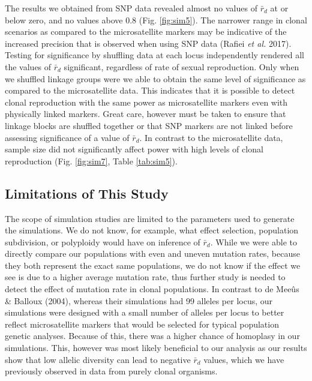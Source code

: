 \documentclass[]{article}
\theoremstyle{definition}
\theoremstyle{definition}
\theoremstyle{definition}
\theoremstyle{remark}
\begin{document}
The results we obtained from SNP data revealed almost no values of
\(\bar{r}_d\) at or below zero, and no values above 0.8 (Fig.
\ref{fig:sim5}). The narrower range in clonal scenarios as compared to
the microsatellite markers may be indicative of the increased precision
that is observed when using SNP data (Rafiei \emph{et al.} 2017).
Testing for significance by shuffling data at each locus independently
rendered all the values of \(\bar{r}_d\) significant, regardless of rate
of sexual reproduction. Only when we shuffled linkage groups were we
able to obtain the same level of significance as compared to the
microsatellite data. This indicates that it is possible to detect clonal
reproduction with the same power as microsatellite markers even with
physically linked markers. Great care, however must be taken to ensure
that linkage blocks are shuffled together or that SNP markers are not
linked before assessing significance of a value of \(\bar{r}_d\). In
contrast to the microsatellite data, sample size did not significantly
affect power with high levels of clonal reproduction (Fig.
\ref{fig:sim7}, Table \ref{tab:sim5}).

\subsection{Limitations of This Study}\label{limitations-of-this-study}

The scope of simulation studies are limited to the parameters used to
generate the simulations. We do not know, for example, what effect
selection, population subdivision, or polyploidy would have on inference
of \(\bar{r}_d\). While we were able to directly compare our populations
with even and uneven mutation rates, because they both represent the
exact same populations, we do not know if the effect we see is due to a
higher average mutation rate, thus further study is needed to detect the
effect of mutation rate in clonal populations. In contrast to de Meeûs
\& Balloux (2004), whereas their simulations had 99 alleles per locus,
our simulations were designed with a small number of alleles per locus
to better reflect microsatellite markers that would be selected for
typical population genetic analyses. Because of this, there was a higher
chance of homoplasy in our simulations. This, however was most likely
beneficial to our analysis as our results show that low allelic
diversity can lead to negative \(\bar{r}_d\) values, which we have
previously observed in data from purely clonal organisms.
\end{document}

